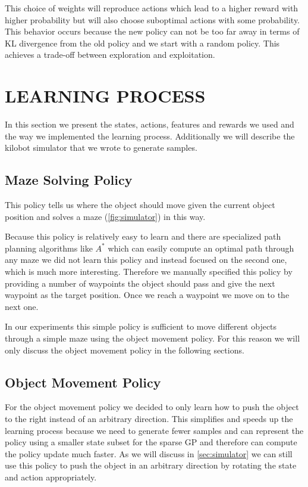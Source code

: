 \documentclass[twoside]{article}
\begin{document}
This choice of weights will reproduce actions which lead to a higher reward with
higher probability but will also choose suboptimal actions with some
probability. This behavior occurs because the new policy can not be too far away
in terms of KL divergence from the old policy and we start with a random policy.
This achieves a trade-off between exploration and exploitation.

\section{LEARNING PROCESS}

In this section we present the states, actions, features and rewards we used and
the way we implemented the learning process. Additionally we will describe the
kilobot simulator that we wrote to generate samples.

\subsection{Maze Solving Policy}
This policy tells us where the object should move given the current object
position and solves a maze (\autoref{fig:simulator}) in this way.

Because this policy is relatively easy to learn and there are specialized path
planning algorithms like $A^*$ which can easily compute an optimal path through
any maze we did not learn this policy and instead focused on the second one,
which is much more interesting. Therefore we manually specified this policy by
providing a number of waypoints the object should pass and give the next
waypoint as the target position. Once we reach a waypoint we move on to the next
one.

In our experiments this simple policy is sufficient to move different objects
through a simple maze using the object movement policy. For this reason we will
only discuss the object movement policy in the following sections.

\subsection{Object Movement Policy}
\label{sec:objpolicy}

For the object movement policy we decided to only learn how to push the object
to the right instead of an arbitrary direction. This simplifies and speeds up
the learning process because we need to generate fewer samples and can represent
the policy using a smaller state subset for the sparse GP and therefore can
compute the policy update much faster. As we will discuss in \ref{sec:simulator}
we can still use this policy to push the object in an arbitrary direction by
rotating the state and action appropriately.
\end{document}
